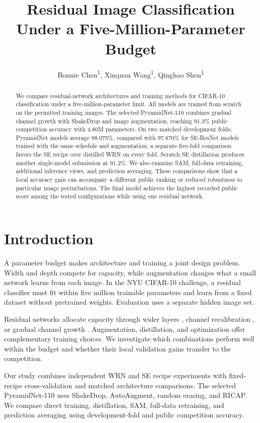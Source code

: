 \documentclass[letterpaper]{article} %
\title{Residual Image Classification Under a Five-Million-Parameter Budget}
\author{
    Bonnie Chen\textsuperscript{\rm 1},
    Xinquan Wang\textsuperscript{\rm 1},
    Qinghao Shen\textsuperscript{\rm 1}
}
\begin{document}
\maketitle
\begin{abstract}
We compare residual-network architectures and training methods for CIFAR-10 classification under a five-million-parameter limit. All models are trained from scratch on the permitted training images. The selected PyramidNet-110 combines gradual channel growth with ShakeDrop and image augmentation, reaching 91.3\% public competition accuracy with 4.80M parameters. On two matched development folds, PyramidNet models average 98.075\%, compared with 97.870\% for SE-ResNet models trained with the same schedule and augmentation; a separate five-fold comparison favors the SE recipe over distilled WRN on every fold. Scratch SE distillation produces another single-model submission at 91.2\%. We also examine SAM, full-data retraining, additional inference views, and prediction averaging. These comparisons show that a local accuracy gain can accompany a different public ranking or reduced robustness to particular image perturbations. The final model achieves the highest recorded public score among the tested configurations while using one residual network.
\end{abstract}

\section{Introduction}
A parameter budget makes architecture and training a joint design problem. Width and depth compete for capacity, while augmentation changes what a small network learns from each image. In the NYU CIFAR-10 challenge, a residual classifier must fit within five million trainable parameters and learn from a fixed dataset without pretrained weights. Evaluation uses a separate hidden image set.

Residual networks \cite{he2016deep} allocate capacity through wider layers \cite{zagoruyko2016wide}, channel recalibration \cite{hu2018squeeze}, or gradual channel growth \cite{pyramid}. Augmentation, distillation, and optimization offer complementary training choices. We investigate which combinations perform well within the budget and whether their local validation gains transfer to the competition.

Our study combines independent WRN and SE recipe experiments with fixed-recipe cross-validation and matched architecture comparisons. The selected PyramidNet-110 uses ShakeDrop, AutoAugment, random erasing, and RICAP. We compare direct training, distillation, SAM, full-data retraining, and prediction averaging using development-fold and public competition accuracy.
\end{document}
